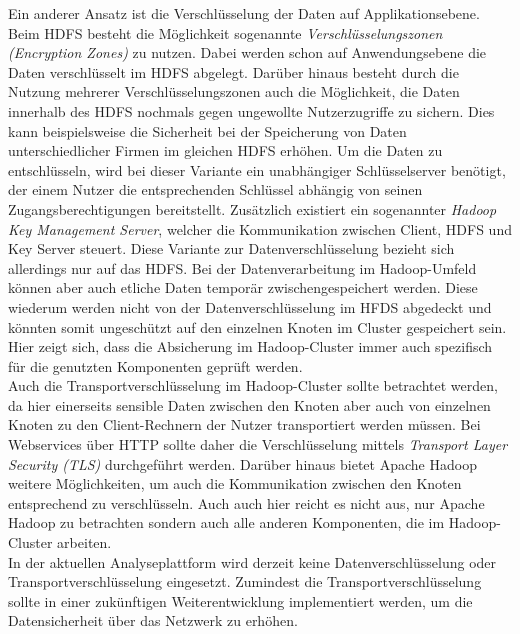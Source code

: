 \noindent
Ein anderer Ansatz ist die Verschlüsselung der Daten auf Applikationsebene. Beim HDFS besteht die Möglichkeit sogenannte \textit{Verschlüsselungszonen (Encryption Zones)} zu nutzen. Dabei werden schon auf Anwendungsebene die Daten verschlüsselt im HDFS abgelegt. Darüber hinaus besteht durch die Nutzung mehrerer Verschlüsselungszonen auch die Möglichkeit, die Daten innerhalb des HDFS nochmals gegen ungewollte Nutzerzugriffe zu sichern. Dies kann beispielsweise die Sicherheit bei der Speicherung von Daten unterschiedlicher Firmen im gleichen HDFS erhöhen. Um die Daten zu entschlüsseln, wird bei dieser Variante ein unabhängiger Schlüsselserver benötigt, der einem Nutzer die entsprechenden Schlüssel abhängig von seinen Zugangsberechtigungen bereitstellt. Zusätzlich existiert ein sogenannter \textit{Hadoop Key Management Server}, welcher die Kommunikation zwischen Client, HDFS und Key Server steuert.\cite[S. 192-200]{hadoop_security}
Diese Variante zur Datenverschlüsselung bezieht sich allerdings nur auf das HDFS. Bei der Datenverarbeitung im Hadoop-Umfeld können aber auch etliche Daten temporär zwischengespeichert werden. Diese wiederum werden nicht von der Datenverschlüsselung im HFDS abgedeckt und könnten somit ungeschützt auf den einzelnen Knoten im Cluster gespeichert sein. Hier zeigt sich, dass die Absicherung im Hadoop-Cluster immer auch spezifisch für die genutzten Komponenten geprüft werden. \\

\noindent
Auch die Transportverschlüsselung im Hadoop-Cluster sollte betrachtet werden, da hier einerseits sensible Daten zwischen den Knoten aber auch von einzelnen Knoten zu den Client-Rechnern der Nutzer transportiert werden müssen. Bei Webservices über HTTP sollte daher die Verschlüsselung mittels \textit{Transport Layer Security (TLS)} durchgeführt werden. Darüber hinaus bietet Apache Hadoop weitere Möglichkeiten, um auch die Kommunikation zwischen den Knoten entsprechend zu verschlüsseln. Auch auch hier reicht es nicht aus, nur Apache Hadoop zu betrachten sondern auch alle anderen Komponenten, die im Hadoop-Cluster arbeiten. \cite[S. 207-216]{hadoop_security}\\

\noindent
In der aktuellen Analyseplattform wird derzeit keine Datenverschlüsselung oder Transportverschlüsselung eingesetzt. Zumindest die Transportverschlüsselung sollte in einer zukünftigen Weiterentwicklung implementiert werden, um die Datensicherheit über das Netzwerk zu erhöhen.

